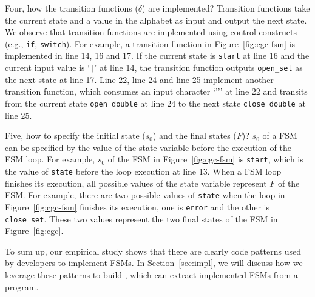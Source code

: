 Four, how the transition functions ($\delta$) are implemented?
Transition functions take the current state and a value
in the alphabet as input and output the next state. 
We observe that transition functions are implemented
using control constructs (e.g., \texttt{if}, \texttt{switch}). 
For example, a transition function in Figure~\ref{fig:cgc-fsm} 
is implemented in line 14, 16 and 17. 
If the current state is \texttt{start} at line 16 and the current input value is 
`\verb/|/’ at line 14, the transition function outputs \texttt{open\_set}
as the next state at line 17. 
Line 22, line 24 and line 25 implement another transition function,
which consumes an input character `''' at line 22 and 
transits from the current state 
\texttt{open\_double} at line 24 to 
the next state \texttt{close\_double} at line 25. 


Five, how to specify the initial state ($s_0$) and the final states ($F$)? 
$s_0$ of a FSM can be specified 
by the value of the state variable before the execution of the FSM loop.
For example,  $s_0$ of the FSM in Figure~\ref{fig:cgc-fsm}
is \texttt{start}, which is the value of \texttt{state} 
before the loop execution at line 13. 
When a FSM loop finishes its execution, 
all possible values of the state variable
represent $F$ of the FSM. 
For example, there are two possible values of \texttt{state} when 
the loop in Figure~\ref{fig:cgc-fsm} finishes its execution, 
one is \texttt{error} and the other is \texttt{close\_set}.
These two values represent the two final states of 
the FSM in Figure~\ref{fig:cgc}.

To sum up, our empirical study shows that 
there are clearly code patterns used by developers to implement FSMs. 
In Section~\ref{sec:impl}, we will discuss how we leverage these patterns to build \Tool{}, 
which can extract implemented FSMs from a program. 




